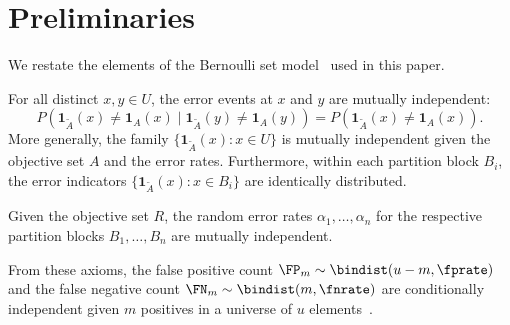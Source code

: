 \section{Preliminaries}
\label{sec:prelim_ent}

We restate the elements of the Bernoulli set model~\cite{bernoulliSets} used in
this paper.

\begin{axiom}
\label{asm:element_indep}
For all distinct $x, y \in U$, the error events at $x$ and $y$ are mutually independent:
\begin{equation}
P(\mathbf{1}_{\tilde{A}}(x) \neq \mathbf{1}_{A}(x) \mid \mathbf{1}_{\tilde{A}}(y) \neq \mathbf{1}_{A}(y)) =
	P(\mathbf{1}_{\tilde{A}}(x) \neq \mathbf{1}_{A}(x)).
\end{equation}
More generally, the family $\{\mathbf{1}_{\tilde{A}}(x) : x \in U\}$ is mutually independent given the objective set $A$ and the error rates.
Furthermore, within each partition block $B_i$, the error indicators $\{\mathbf{1}_{\tilde{A}}(x) : x \in B_i\}$ are identically distributed.
\end{axiom}

\begin{axiom}
\label{asm:fpr_fnr_r_indep}
Given the objective set $R$, the random error rates $\alpha_1, \ldots, \alpha_n$ for the respective partition blocks $B_1, \ldots, B_n$ are mutually independent.
\end{axiom}

From these axioms, the false positive count
$\FP_m \sim \bindist(u-m, \fprate)$ and the false negative count
$\FN_m \sim \bindist(m, \fnrate)$ are conditionally independent given $m$
positives in a universe of $u$ elements~\cite{bernoulliSets}.
